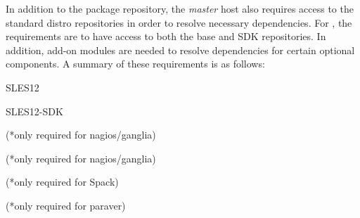 In addition to the \OHPC{} package repository, the {\em master} host also
requires access to the standard distro repositories in order to resolve
necessary dependencies. For \baseOS{}, the requirements are to have access to
both the base and SDK repositories. In addition, add-on modules are needed to
resolve dependencies for certain optional components. A summary of these 
requirements is as follows:

\begin{itemize*}
\item SLES12
\item SLES12-SDK
\item
  \href{https://www.suse.com/products/server/features/modules/}{\color{blue}{Web
      and Scripting Module}} (*only required for nagios/ganglia)
\item
  \href{http://download.opensuse.org/repositories/server:/monitoring/SLE_12_SP3/}
       {\color{blue}{Server Monitoring Software}} (*only required for nagios/ganglia)
\item
  \href{http://download.opensuse.org/repositories/devel:/languages:/python/SLE_12_SP3/}
       {\color{blue}{Python development packages}} (*only required for Spack)
\item
  \href{http://download.opensuse.org/repositories/X11:/wxWidgets/SLE_12_SP3/}
       {\color{blue}{X11 wxWidgets development packages}} (*only required for paraver)
\end{itemize*}
